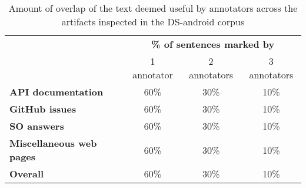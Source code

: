 \begin{table}[H]
\centering    
\caption{Amount of overlap of the text deemed useful by annotators across the artifacts inspected in the \acs{DS-android} corpus}
\label{tbl:corpus-annotation-overlap}
\begin{scriptsize}
\begin{threeparttable}
\begin{tabular}{lccc}





& \multicolumn{3}{c}{\textbf{\% of sentences marked by}}
\\ \cmidrule(l){2-4} 
& 1 annotator & 2 annotators & 3 annotators  \\

\hline

\textbf{API documentation} 
& 60\% & 30\% & 10\%
\\
\textbf{GitHub issues} 
& 60\% & 30\% & 10\%
\\
\textbf{SO answers} 
& 60\% & 30\% & 10\%
\\
\textbf{Miscellaneous web pages} 
& 60\% & 30\% & 10\%
\\

\hline
\textbf{Overall} 
& 60\% & 30\% & 10\%
\\
\hline

\end{tabular}
\end{threeparttable}
\end{scriptsize}
\end{table}


